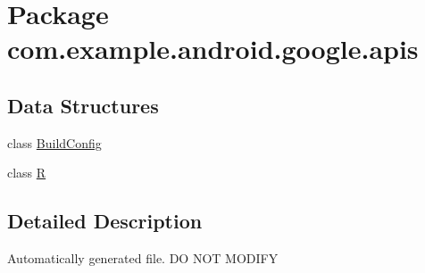 \hypertarget{namespacecom_1_1example_1_1android_1_1google_1_1apis}{\section{Package com.\-example.\-android.\-google.\-apis}
\label{namespacecom_1_1example_1_1android_1_1google_1_1apis}
}
\subsection*{Data Structures}
\begin{DoxyCompactItemize}
\item 
class \hyperlink{classcom_1_1example_1_1android_1_1google_1_1apis_1_1_build_config}{Build\-Config}
\item 
class \hyperlink{classcom_1_1example_1_1android_1_1google_1_1apis_1_1_r}{R}
\end{DoxyCompactItemize}


\subsection{Detailed Description}
Automatically generated file. D\-O N\-O\-T M\-O\-D\-I\-F\-Y 
